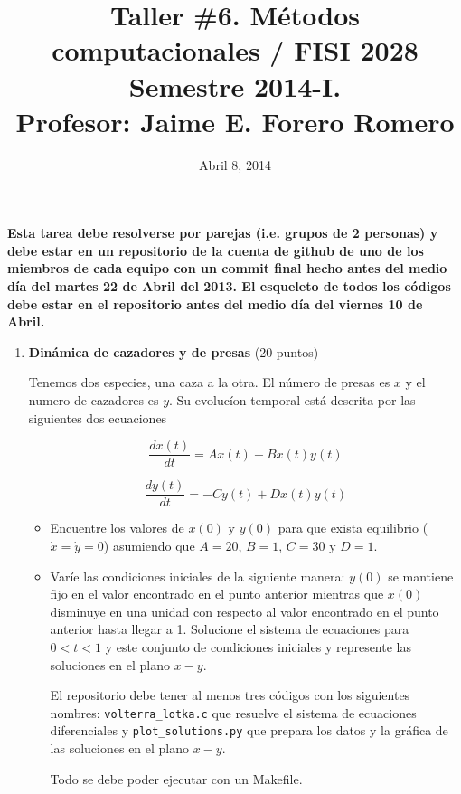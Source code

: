 \documentclass{article}
\title{Taller \#6. M\'etodos computacionales / FISI 2028 \\Semestre
  2014-I. \\ Profesor: Jaime E. Forero Romero}
\date{Abril 8, 2014}
\begin{document}
\maketitle

{\bf Esta tarea debe resolverse por parejas (i.e. grupos de 2
  personas) y debe estar en un repositorio de la cuenta de github de
  uno de los miembros de cada equipo con un commit final hecho antes del
  medio d\'ia del martes 22 de Abril del 2013. El esqueleto de todos los c\'odigos debe estar en el repositorio antes del medio d\'ia del
  viernes 10 de Abril.}   

\begin{enumerate}

\item {\bf Din\'amica de cazadores y de presas} (20 puntos)


Tenemos dos especies, una caza a la otra. El n\'umero de presas es $x$
y el numero de cazadores es $y$. Su evoluc\'ion temporal est\'a
descrita por las siguientes dos ecuaciones 

\begin{equation}
\frac{dx (t)}{dt} = Ax(t) - Bx(t)y(t)
\end{equation}

\begin{equation}
\frac{dy (t)}{dt} = -Cy(t) + Dx(t)y(t)
\end{equation}

\begin{itemize}
\item Encuentre los valores de $x(0)$ y $y(0)$ para que exista equilibrio
($\dot{x}=\dot{y}=0$) asumiendo que $A=20$, $B=1$, $C=30$ y $D=1$.

\item Var\'ie las condiciones iniciales de la siguiente manera: $y(0)$
  se mantiene fijo en el valor encontrado en el punto anterior
  mientras que $x(0)$ disminuye en una unidad con respecto al valor
  encontrado en el punto anterior hasta llegar a 1. Solucione el
  sistema de ecuaciones  para $0<t<1$ y este conjunto de condiciones
  iniciales y represente las soluciones en el plano $x-y$. 

  El repositorio debe tener al menos tres c\'odigos con los siguientes
  nombres: \verb"volterra_lotka.c" que resuelve el sistema de ecuaciones
  diferenciales y \verb"plot_solutions.py" que prepara los datos y la
  gr\'afica de las soluciones en el plano $x-y$. 

  Todo se debe poder ejecutar con un Makefile.


\end{itemize}
\end{enumerate}
\end{document}
